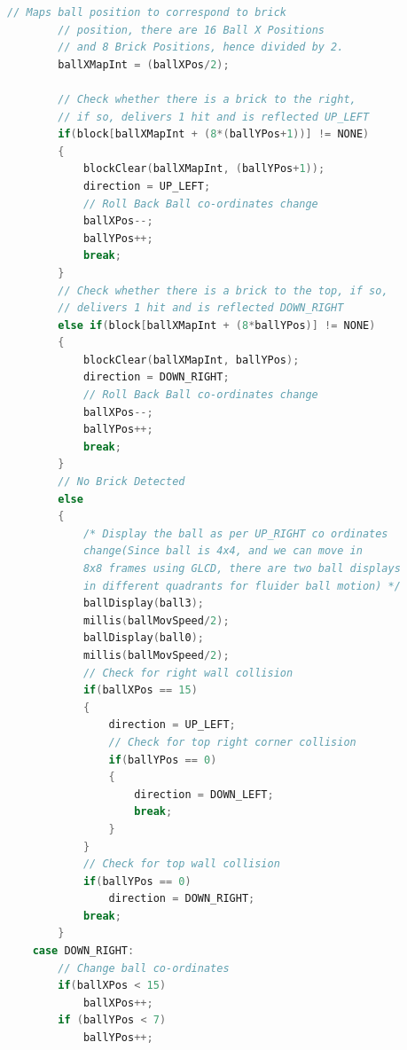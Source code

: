 \documentclass{article}
\begin{document}
\begin{lstlisting}[basicstyle = \small, language = C]
        // Maps ball position to correspond to brick 
        // position, there are 16 Ball X Positions
        // and 8 Brick Positions, hence divided by 2.
        ballXMapInt = (ballXPos/2);

        // Check whether there is a brick to the right, 
        // if so, delivers 1 hit and is reflected UP_LEFT
        if(block[ballXMapInt + (8*(ballYPos+1))] != NONE)
        {
            blockClear(ballXMapInt, (ballYPos+1));
            direction = UP_LEFT;
            // Roll Back Ball co-ordinates change
            ballXPos--;
            ballYPos++;
            break;
        }
        // Check whether there is a brick to the top, if so, 
        // delivers 1 hit and is reflected DOWN_RIGHT
        else if(block[ballXMapInt + (8*ballYPos)] != NONE)
        {
            blockClear(ballXMapInt, ballYPos);
            direction = DOWN_RIGHT;
            // Roll Back Ball co-ordinates change
            ballXPos--;
            ballYPos++;
            break;
        }
        // No Brick Detected
        else
        {
            /* Display the ball as per UP_RIGHT co ordinates 
            change(Since ball is 4x4, and we can move in 
            8x8 frames using GLCD, there are two ball displays 
            in different quadrants for fluider ball motion) */
            ballDisplay(ball3);
            millis(ballMovSpeed/2);
            ballDisplay(ball0);
            millis(ballMovSpeed/2);
            // Check for right wall collision
            if(ballXPos == 15)
            {
                direction = UP_LEFT;
                // Check for top right corner collision
                if(ballYPos == 0)
                {
                    direction = DOWN_LEFT;
                    break;
                }
            }
            // Check for top wall collision
            if(ballYPos == 0)
                direction = DOWN_RIGHT;
            break;
        }
    case DOWN_RIGHT:
        // Change ball co-ordinates
        if(ballXPos < 15)
            ballXPos++;
        if (ballYPos < 7)
            ballYPos++;


\end{lstlisting}
\end{document}

